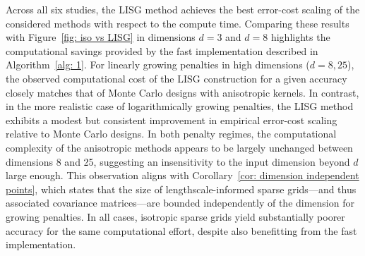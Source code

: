 \documentclass[pdflatex,sn-mathphys-num]{sn-jnl}%
\theoremstyle{thmstyleone}%
\theoremstyle{thmstyletwo}%
\theoremstyle{thmstylethree}%
\begin{document}
Across all six studies, the LISG method achieves the best error-cost scaling of the considered methods with respect to the compute time. Comparing these results with Figure~\ref{fig: iso vs LISG} in dimensions \(d=3\) and \(d=8\) highlights the computational savings provided by the fast implementation described in Algorithm~\ref{alg: 1}. For linearly growing penalties in high dimensions (\(d=8,25\)), the observed computational cost of the LISG construction for a given accuracy closely matches that of Monte Carlo designs with anisotropic kernels. In contrast, in the more realistic case of logarithmically growing penalties, the LISG method exhibits a modest but consistent improvement in empirical error-cost scaling relative to Monte Carlo designs. In both penalty regimes, the computational complexity of the anisotropic methods appears to be largely unchanged between dimensions 8 and 25, suggesting an insensitivity to the input dimension beyond \(d\) large enough. This observation aligns with Corollary~\ref{cor: dimension independent points}, which states that the size of lengthscale-informed sparse grids---and thus associated covariance matrices---are bounded independently of the dimension for growing penalties. In all cases, isotropic sparse grids yield substantially poorer accuracy for the same computational effort, despite also benefitting from the fast implementation.
\end{document}
